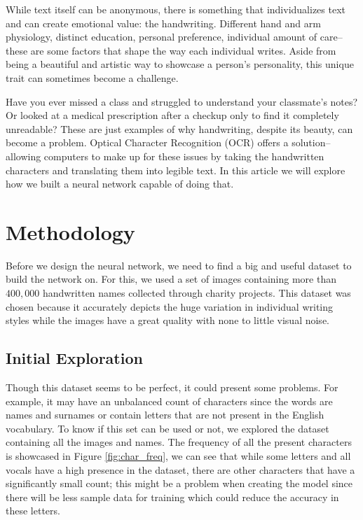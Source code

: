 \documentclass[11pt,letterpaper]{article}
\begin{document}
	While text itself can be anonymous, there is something that individualizes text and can create emotional value: the handwriting. Different hand and arm physiology, distinct education, personal preference, individual amount of care--these are some factors that shape the way each individual writes. Aside from being a beautiful and artistic way to showcase a person's personality, this unique trait can sometimes become a challenge.
	
	Have you ever missed a class and struggled to understand your classmate's notes? Or looked at a medical prescription after a checkup only to find it completely unreadable? These are just examples of why handwriting, despite its beauty, can become a problem. Optical Character Recognition (OCR) offers a solution--allowing computers to make up for these issues by taking the handwritten characters and translating them into legible text. In this article we will explore how we built a neural network capable of doing that.
	
	\section{Methodology}
	Before we design the neural network, we need to find a big and useful dataset to build the network on. For this, we used a set of images \cite{handwriting-dataset} containing more than $400,000$ handwritten names collected through charity projects. This dataset was chosen because it accurately depicts the huge variation in individual writing styles while the images have a great quality with none to little visual noise.
	
	\subsection{Initial Exploration}
	Though this dataset seems to be perfect, it could present some problems. For example, it may have an unbalanced count of characters since the words are names and surnames or contain letters that are not present in the English vocabulary. To know if this set can be used or not, we explored the dataset containing all the images and names. The frequency of all the present characters is showcased in Figure \ref{fig:char_freq}, we can see that while some letters and all vocals have a high presence in the dataset, there are other characters that have a significantly small count; this might be a problem when creating the model since there will be less sample data for training which could reduce the accuracy in these letters.
	
\end{document}
